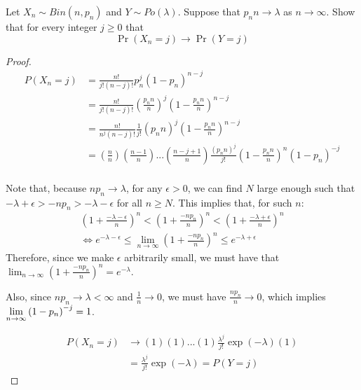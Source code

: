 \documentclass[12pt, letterpaper]{paper}
\begin{document}
\begin{question}
  Let $X_n \sim Bin( n, p_n )$ and $Y \sim Po(\lambda)$. Suppose that $p_n n \to \lambda$
  as $n \to \infty$. Show that for every integer $j \geq 0$ that
  \begin{equation*}
    \Pr \left(  X_n = j \right ) \to \Pr \left(  Y = j \right )
  \end{equation*}
  \begin{proof}
    \begin{align*}
      P(X_n = j) &= \frac{n!}{j! (n-j)!} p_n^j ( 1 - p_n)^{n-j}\\
      &= \frac{n!}{j! (n-j)!} \left( \frac{p_n n}{n} \right)^j \left(
        1 - \frac{p_n n}{n} \right)^{n - j}\\
                 &= \frac{n!}{n^{j} (n-j)!} \frac{1}{j!} ( p_n n )^j
                   \left( 1 - \frac{p_n n}{n} \right)^{n-j}\\
      &= \left( \frac{n}{n} \right) \left( \frac{n-1}{n} \right)
        ... \left( \frac{n-j +1}{n} \right) \frac{(p_n n)^j}{j!}
        \left( 1 - \frac{p_n n}{n} \right)^n \left( 1 - p_n
        \right)^{-j}\\
    \end{align*}

    Note that, because $np_n\to\lambda$, for any $\epsilon>0$, we can find $N$ large enough such that $-\lambda+\epsilon>-np_n>-\lambda-\epsilon$ for all $n\ge N$. This implies that, for such $n$:
\begin{equation}
\begin{split}
    (1+\frac{-\lambda-\epsilon}{n})^{n}<(1+\frac{-np_n}{n})^{n}<(1+\frac{-\lambda+\epsilon}{n})^{n}\\
    \Longleftrightarrow e^{-\lambda-\epsilon}\le \lim_{n\to\infty}{(1+\frac{-np_n}{n})^{n}}\le e^{-\lambda+\epsilon}
\end{split}
\end{equation}
\noindent Therefore, since we make $\epsilon$ arbitrarily small, we must have that $\lim_{n\to\infty}{(1+\frac{-np_n}{n})^{n}}=e^{-\lambda}$.


   Also, since $np_n\to\lambda<\infty$ and $\frac{1}{n}\to 0$, we must have $\frac{np_n}{n}\to 0$, which implies $\lim\limits_{n \to \infty} \left(  1 - p_n \right)^{-j} = 1$. 

   \begin{align*}
     P(X_n = j) &\rightarrow  (1) (1) ... (1) \frac{\lambda^j}{j!} \exp(-\lambda) (1)\\
                &= \frac{\lambda^j}{j!} \exp( - \lambda) = P( Y = j)
   \end{align*}
    

  \end{proof}
\end{question}
\end{document}
